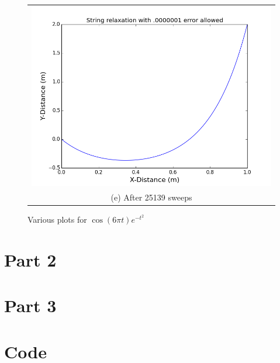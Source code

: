 \documentclass[11pt]{article}
\begin{document}
\begin{figure}[H]
\begin{tabular}{cc}
\multicolumn{2}{c}{\includegraphics[scale=.3]{1_relaxation(0000001).png}}\\
\multicolumn{2}{c}{(e) After 25139 sweeps} \\[6pt]
\end{tabular}
\caption{Various plots for $\cos (6\pi t) e^{-t^2} $}
\end{figure}

\section{Part 2}

\section{Part 3}

\section{Code}
\end{document}
